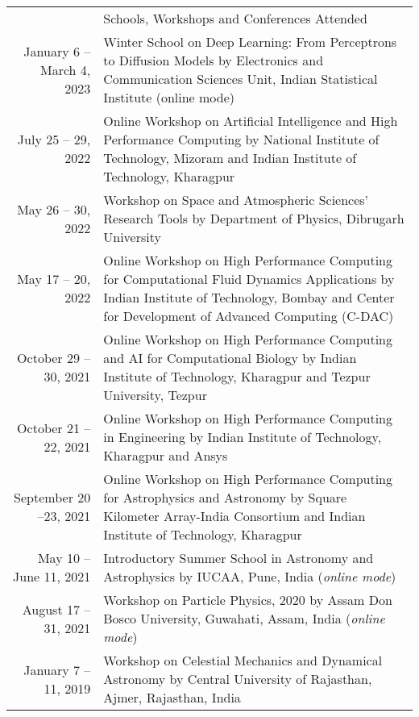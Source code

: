 \documentclass[a4paper, 11pt]{article}
\newcommand{\headingfont}{\Large\color{Bittersweet}}
\newenvironment{SectionTable}[1]{
	\renewcommand*{\arraystretch}{1.7}
	\setlength{\tabcolsep}{10pt}
	\begin{longtable}{Rp{5.2in}} & #1 \\}
{\end{longtable}\vspace{-.3cm}}
\begin{document}

\begin{SectionTable}{\headingfont Schools, Workshops and Conferences Attended}

January 6 -- March 4, 2023 &
Winter School on Deep Learning: From Perceptrons to Diffusion Models by Electronics and Communication Sciences Unit, Indian Statistical Institute (online mode)
\\

July 25 -- 29, 2022 & 
Online Workshop on Artificial Intelligence and High Performance Computing by National Institute of Technology, Mizoram and Indian Institute of Technology, Kharagpur
\\
	 
May 26 -- 30, 2022 &
Workshop on Space and Atmospheric Sciences' Research Tools by Department of Physics, Dibrugarh University
\\

May 17 -- 20, 2022 & 
Online Workshop on High Performance Computing for Computational Fluid Dynamics Applications by Indian Institute of Technology, Bombay and Center for Development of Advanced Computing (C-DAC)
 \\

October 29 -- 30, 2021 & 
Online Workshop on High Performance Computing and AI for Computational Biology by Indian Institute of Technology, Kharagpur and Tezpur University, Tezpur
 \\
October 21 -- 22, 2021 & 
Online Workshop on High Performance Computing in Engineering by Indian Institute of Technology, Kharagpur and Ansys
 \\
 
September 20 --23, 2021 & 
Online Workshop on High Performance Computing for Astrophysics and Astronomy by Square Kilometer Array-India Consortium and Indian Institute of Technology, Kharagpur
 \\

May 10 -- June 11, 2021 &
Introductory Summer School in Astronomy and Astrophysics by IUCAA, Pune, India (\textit{online mode})
\\

August 17 --31, 2021 &
Workshop on Particle Physics, 2020 by Assam Don Bosco University, Guwahati, Assam, India (\textit{online mode})
\\

January 7 --11, 2019 &
Workshop on Celestial Mechanics and Dynamical Astronomy by Central University of Rajasthan, Ajmer, Rajasthan, India
\\


\end{SectionTable}
\end{document}
